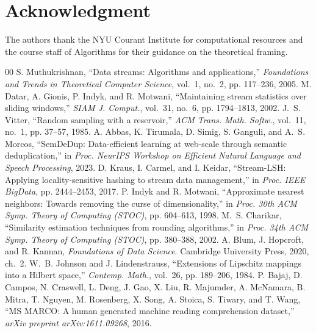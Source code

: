 \documentclass[conference]{IEEEtran}
\begin{document}
\section*{Acknowledgment}
The authors thank the NYU Courant Institute for computational resources
and the course staff of Algorithms for their guidance on the theoretical
framing.

\begin{thebibliography}{00}
 S. Muthukrishnan, ``Data streams: Algorithms and applications,'' \textit{Foundations and Trends in Theoretical Computer Science}, vol.~1, no.~2, pp. 117--236, 2005.
 M. Datar, A. Gionis, P. Indyk, and R. Motwani, ``Maintaining stream statistics over sliding windows,'' \textit{SIAM J. Comput.}, vol.~31, no.~6, pp. 1794--1813, 2002.
 J.~S. Vitter, ``Random sampling with a reservoir,'' \textit{ACM Trans. Math. Softw.}, vol.~11, no.~1, pp. 37--57, 1985.
 A. Abbas, K. Tirumala, D. Simig, S. Ganguli, and A.~S. Morcos, ``SemDeDup: Data-efficient learning at web-scale through semantic deduplication,'' in \textit{Proc. NeurIPS Workshop on Efficient Natural Language and Speech Processing}, 2023.
 D. Kraus, I. Carmel, and I. Keidar, ``Stream-LSH: Applying locality-sensitive hashing to stream data management,'' in \textit{Proc. IEEE BigData}, pp. 2444--2453, 2017.
 P. Indyk and R. Motwani, ``Approximate nearest neighbors: Towards removing the curse of dimensionality,'' in \textit{Proc. 30th ACM Symp. Theory of Computing (STOC)}, pp. 604--613, 1998.
 M.~S. Charikar, ``Similarity estimation techniques from rounding algorithms,'' in \textit{Proc. 34th ACM Symp. Theory of Computing (STOC)}, pp. 380--388, 2002.
 A. Blum, J. Hopcroft, and R. Kannan, \textit{Foundations of Data Science}. Cambridge University Press, 2020, ch.~2.
 W.~B. Johnson and J. Lindenstrauss, ``Extensions of Lipschitz mappings into a Hilbert space,'' \textit{Contemp. Math.}, vol.~26, pp. 189--206, 1984.
 P. Bajaj, D. Campos, N. Craswell, L. Deng, J. Gao, X. Liu, R. Majumder, A. McNamara, B. Mitra, T. Nguyen, M. Rosenberg, X. Song, A. Stoica, S. Tiwary, and T. Wang, ``MS MARCO: A human generated machine reading comprehension dataset,'' \textit{arXiv preprint arXiv:1611.09268}, 2016.
\end{thebibliography}
\end{document}
